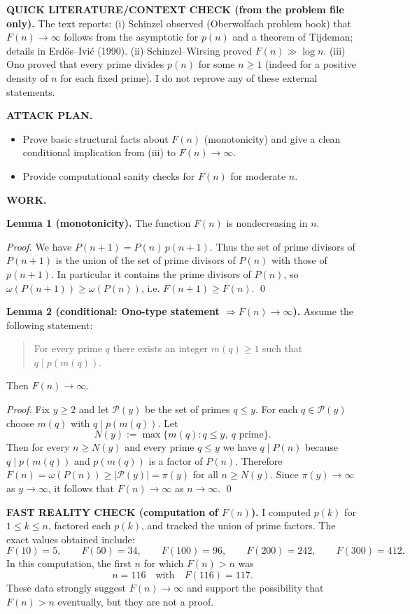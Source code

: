 \medskip
\noindent\textbf{QUICK LITERATURE/CONTEXT CHECK (from the problem file only).}
The text reports:
(i) Schinzel observed (Oberwolfach problem book) that $F(n)\to\infty$ follows from the asymptotic for $p(n)$ and a theorem of Tijdeman; details in Erd\H{o}s--Ivi\'{c} (1990).
(ii) Schinzel--Wirsing proved $F(n)\gg \log n$.
(iii) Ono proved that every prime divides $p(n)$ for some $n\ge 1$ (indeed for a positive density of $n$ for each fixed prime).
I do not reprove any of these external statements.

\medskip
\noindent\textbf{ATTACK PLAN.}
\begin{itemize}
\item Prove basic structural facts about $F(n)$ (monotonicity) and give a clean conditional implication from (iii) to $F(n)\to\infty$.
\item Provide computational sanity checks for $F(n)$ for moderate $n$.
\end{itemize}

\medskip
\noindent\textbf{WORK.}

\medskip
\noindent\textbf{Lemma 1 (monotonicity).}
The function $F(n)$ is nondecreasing in $n$.

\noindent\emph{Proof.}
We have $P(n+1)=P(n)\,p(n+1)$.
Thus the set of prime divisors of $P(n+1)$ is the union of the set of prime divisors of $P(n)$ with those of $p(n+1)$.
In particular it contains the prime divisors of $P(n)$, so $\omega(P(n+1))\ge \omega(P(n))$, i.e. $F(n+1)\ge F(n)$. \qed

\medskip
\noindent\textbf{Lemma 2 (conditional: Ono-type statement $\Rightarrow F(n)\to\infty$).}
Assume the following statement:
\begin{quote}
For every prime $q$ there exists an integer $m(q)\ge 1$ such that $q\mid p(m(q))$.
\end{quote}
Then $F(n)\to\infty$.

\noindent\emph{Proof.}
Fix $y\ge 2$ and let $\mathcal P(y)$ be the set of primes $q\le y$.
For each $q\in\mathcal P(y)$ choose $m(q)$ with $q\mid p(m(q))$.
Let
\[N(y):=\max\{m(q): q\le y,\ q\text{ prime}\}.
\]
Then for every $n\ge N(y)$ and every prime $q\le y$ we have $q\mid P(n)$ because $q\mid p(m(q))$ and $p(m(q))$ is a factor of $P(n)$.
Therefore $F(n)=\omega(P(n))\ge |\mathcal P(y)|=\pi(y)$ for all $n\ge N(y)$.
Since $\pi(y)\to\infty$ as $y\to\infty$, it follows that $F(n)\to\infty$ as $n\to\infty$. \qed

\medskip
\noindent\textbf{FAST REALITY CHECK (computation of $F(n)$).}
I computed $p(k)$ for $1\le k\le n$, factored each $p(k)$, and tracked the union of prime factors.
The exact values obtained include:
\[
F(10)=5,\qquad F(50)=34,\qquad F(100)=96,\qquad F(200)=242,\qquad F(300)=412.
\]
In this computation, the first $n$ for which $F(n)>n$ was
\[n=116\quad\text{with}\quad F(116)=117.
\]
These data strongly suggest $F(n)\to\infty$ and support the possibility that $F(n)>n$ eventually, but they are not a proof.

